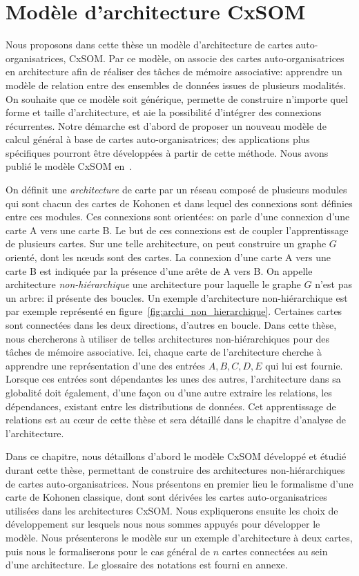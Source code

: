
\chapter{Modèle d'architecture CxSOM}
\graphicspath{{02-SOM/}}
\minitoc

Nous proposons dans cette thèse un modèle d'architecture de cartes auto-organisatrices, CxSOM. Par ce modèle, on associe des cartes auto-organisatrices en architecture afin de réaliser des tâches de mémoire associative: apprendre un modèle de relation entre des ensembles de données issues de plusieurs modalités. 
On souhaite que ce modèle soit générique, permette de construire n'importe quel forme et taille d'architecture, et aie la possibilité d'intégrer des connexions récurrentes. Notre démarche est d'abord de proposer un nouveau modèle de calcul général à base de cartes auto-organisatrices; des applications plus spécifiques pourront être développées à partir de cette méthode. Nous avons publié le modèle CxSOM en~\cite{gonnier2020}.


On définit une \emph{architecture} de carte par un réseau composé de plusieurs modules qui sont chacun des cartes de Kohonen et dans lequel des connexions sont définies entre ces modules. Ces connexions sont orientées: on parle d'une connexion d'une carte A vers une carte B. Le but de ces connexions est de coupler l'apprentissage de plusieurs cartes.
Sur une telle architecture, on peut construire un graphe $G$ orienté, dont les n\oe{}uds sont des cartes. La connexion d'une carte A vers une carte B est indiquée par la présence d'une arête de A vers B. On appelle architecture \emph{non-hiérarchique} une architecture pour laquelle le graphe $G$ n'est pas un arbre: il présente des boucles. Un exemple d'architecture non-hiérarchique est par exemple représenté en figure~\ref{fig:archi_non_hierarchique}. Certaines cartes sont connectées dans les deux directions, d'autres en boucle. Dans cette thèse, nous chercherons à utiliser de telles architectures non-hiérarchiques pour des tâches de mémoire associative.
Ici, chaque carte de l'architecture cherche à apprendre une représentation d'une des entrées $A,B,C,D,E$ qui lui est fournie. 
Lorsque ces entrées sont dépendantes les unes des autres, l'architecture dans sa globalité doit également, d'une façon ou d'une autre extraire les relations, les dépendances, existant entre les distributions de données. Cet apprentissage de relations est au c\oe{}ur de cette thèse et sera détaillé dans le chapitre d'analyse de l'architecture.

Dans ce chapitre, nous détaillons d'abord le modèle CxSOM développé et étudié durant cette thèse, permettant de construire des architectures non-hiérarchiques de cartes auto-organisatrices. Nous présentons en premier lieu le formalisme d'une carte de Kohonen classique, dont sont dérivées les cartes auto-organisatrices utilisées dans les architectures CxSOM. Nous expliquerons ensuite les choix de développement sur lesquels nous nous sommes appuyés pour développer le modèle. Nous présenterons le modèle sur un exemple d'architecture à deux cartes, puis nous le formaliserons pour le cas général de $n$ cartes connectées au sein d'une architecture. Le glossaire des notations est fourni en annexe.

